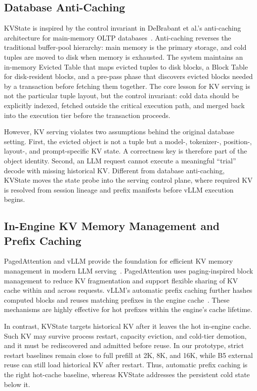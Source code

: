 \documentclass[sigconf,review,anonymous]{acmart}
\newcommand{\system}{KVState\xspace}
\begin{document}
\subsection{Database Anti-Caching}

\system is inspired by the control invariant in DeBrabant et al.'s anti-caching
architecture for main-memory OLTP databases~\citep{debrabant2013anticaching}.
Anti-caching
reverses the traditional buffer-pool hierarchy: main memory is the primary
storage, and cold tuples are moved to disk when memory is exhausted. The system
maintains an in-memory Evicted Table that maps evicted tuples to disk blocks, a
Block Table for disk-resident blocks, and a pre-pass phase that discovers
evicted blocks needed by a transaction before fetching them together. The core
lesson for KV serving is not the particular tuple layout, but the control
invariant: cold data should be explicitly indexed, fetched outside the critical
execution path, and merged back into the execution tier before the transaction
proceeds.

However, KV serving violates two assumptions behind the original database
setting. First, the evicted object is not a tuple but a model-, tokenizer-,
position-, layout-, and prompt-specific KV state. A correctness key is therefore
part of the object identity. Second, an LLM request cannot execute a meaningful
``trial'' decode with missing historical KV. Different from database
anti-caching, \system moves the state probe into the serving control plane,
where required KV is resolved from session lineage and prefix manifests before
vLLM execution begins.

\subsection{In-Engine KV Memory Management and Prefix Caching}

PagedAttention and vLLM provide the foundation for efficient KV memory
management in modern LLM serving~\citep{kwon2023pagedattention}.
PagedAttention uses paging-inspired block management to reduce KV fragmentation
and support flexible sharing of KV cache within and across requests. vLLM's
automatic prefix caching further hashes computed blocks and reuses matching
prefixes in the engine cache~\citep{vllmPrefixCaching}. These mechanisms are
highly effective for hot prefixes within the engine's cache lifetime.

In contrast, \system targets historical KV after it leaves the hot in-engine
cache. Such KV may survive process restart, capacity eviction, and cold-tier
demotion, and it must be rediscovered and admitted before reuse. In our
prototype, strict restart baselines remain close to full prefill at 2K, 8K, and
16K, while B5 external reuse can still load historical KV after restart. Thus,
automatic prefix caching is the right hot-cache baseline, whereas \system
addresses the persistent cold state below it.
\end{document}
